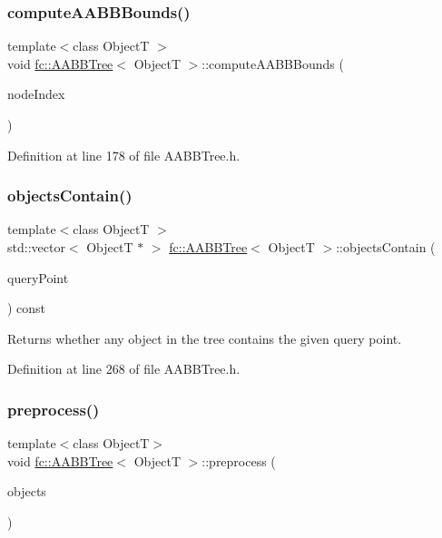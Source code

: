 \subsubsection{\texorpdfstring{compute\+A\+A\+B\+B\+Bounds()}{computeAABBBounds()}}
{\footnotesize\ttfamily template$<$class ObjectT $>$ \\
void \hyperlink{classfc_1_1AABBTree}{fc\+::\+A\+A\+B\+B\+Tree}$<$ ObjectT $>$\+::compute\+A\+A\+B\+B\+Bounds (\begin{DoxyParamCaption}\item[{\hyperlink{classfc_1_1AABBTree_a18706db5b992d8875e08dc325abf3811}{aabb\+Tree\+\_\+size\+\_\+type}}]{node\+Index }\end{DoxyParamCaption})\hspace{0.3cm}{\ttfamily [private]}}



Definition at line 178 of file A\+A\+B\+B\+Tree.\+h.

\mbox{\label{classfc_1_1AABBTree_aef6e5c039251417ae18f17cf9f30f638}} 
\subsubsection{\texorpdfstring{objects\+Contain()}{objectsContain()}}
{\footnotesize\ttfamily template$<$class ObjectT $>$ \\
std\+::vector$<$ ObjectT $\ast$ $>$ \hyperlink{classfc_1_1AABBTree}{fc\+::\+A\+A\+B\+B\+Tree}$<$ ObjectT $>$\+::objects\+Contain (\begin{DoxyParamCaption}\item[{\hyperlink{classfc_1_1Vector2}{Vector2}$<$ double $>$ const \&}]{query\+Point }\end{DoxyParamCaption}) const}

Returns whether any object in the tree contains the given query point. 

Definition at line 268 of file A\+A\+B\+B\+Tree.\+h.

\mbox{\label{classfc_1_1AABBTree_a481a24bdded9dfbebfcb298899126df3}} 
\subsubsection{\texorpdfstring{preprocess()}{preprocess()}}
{\footnotesize\ttfamily template$<$class ObjectT$>$ \\
void \hyperlink{classfc_1_1AABBTree}{fc\+::\+A\+A\+B\+B\+Tree}$<$ ObjectT $>$\+::preprocess (\begin{DoxyParamCaption}\item[{std\+::vector$<$ ObjectT $>$ $\ast$}]{objects }\end{DoxyParamCaption})}

